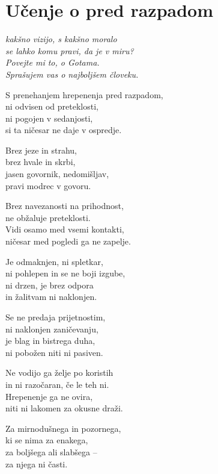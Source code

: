\cleartorecto
{}
\chapter{Učenje o pred razpadom}

\emph{kakšno vizijo, s kakšno moralo\\
se lahko komu pravi, da je v miru?\\
Povejte mi to, o Gotama.\\
Sprašujem vas o najboljšem človeku.}

S prenehanjem hrepenenja pred razpadom,\\
ni odvisen od preteklosti,\\
ni pogojen v sedanjosti,\\
si ta ničesar ne daje v ospredje.

Brez jeze in strahu,\\
brez hvale in skrbi,\\
jasen govornik, nedomišljav,\\
pravi modrec v govoru.

Brez navezanosti na prihodnost,\\
ne obžaluje preteklosti.\\
Vidi osamo med vsemi kontakti,\\
ničesar med pogledi ga ne zapelje.

\clearpage

Je odmaknjen, ni spletkar,\\
ni pohlepen in se ne boji izgube,\\
ni drzen, je brez odpora\\
in žalitvam ni naklonjen.

Se ne predaja prijetnostim,\\
ni naklonjen zaničevanju,\\
je blag in bistrega duha,\\
ni pobožen niti ni pasiven.

Ne vodijo ga želje po koristih\\
in ni razočaran, če le teh ni.\\
Hrepenenje ga ne ovira,\\
niti ni lakomen za okusne draži.

Za mirnodušnega in pozornega,\\
ki se nima za enakega,\\
za boljšega ali slabšega --\\
za njega ni časti.

